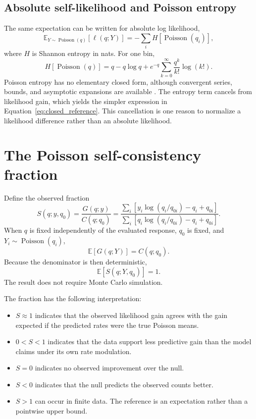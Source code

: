 \documentclass[11pt]{article}
\newcommand{\E}{\mathbb{E}}
\newcommand{\Pois}{\operatorname{Poisson}}
\begin{document}
\subsection{Absolute self-likelihood and Poisson entropy}

The same expectation can be written for absolute log likelihood,
\begin{equation}
\E_{Y\sim\Pois(q)}[\ell(q;Y)]
=
-\sum_i H[\Pois(q_i)],
\end{equation}
where $H$ is Shannon entropy in nats. For one bin,
\begin{equation}
H[\Pois(q)]
=
q-q\log q
+e^{-q}\sum_{k=0}^{\infty}\frac{q^k}{k!}\log(k!).
\end{equation}
Poisson entropy has no elementary closed form, although convergent series, bounds, and asymptotic expansions are available \cite{knessl1998,adell2010}. The entropy term cancels from likelihood gain, which yields the simpler expression in Equation~\ref{eq:closed_reference}. This cancellation is one reason to normalize a likelihood difference rather than an absolute likelihood.

\section{The Poisson self-consistency fraction}

Define the observed fraction
\begin{equation}
\boxed{
S(q;y,q_0)
=
\frac{G(q;y)}{C(q;q_0)}
=
\frac{
\sum_i\left[
 y_i\log(q_i/q_{0i})-q_i+q_{0i}
\right]
}{
\sum_i\left[
 q_i\log(q_i/q_{0i})-q_i+q_{0i}
\right]
}.
}
\label{eq:self_fraction}
\end{equation}
When $q$ is fixed independently of the evaluated response, $q_0$ is fixed, and $Y_i\sim\Pois(q_i)$,
\begin{equation}
\E[G(q;Y)]=C(q;q_0).
\end{equation}
Because the denominator is then deterministic,
\begin{equation}
\boxed{\E[S(q;Y,q_0)]=1.}
\end{equation}
The result does not require Monte Carlo simulation.

The fraction has the following interpretation:
\begin{itemize}
    \item $S\approx1$ indicates that the observed likelihood gain agrees with the gain expected if the predicted rates were the true Poisson means.
    \item $0<S<1$ indicates that the data support less predictive gain than the model claims under its own rate modulation.
    \item $S=0$ indicates no observed improvement over the null.
    \item $S<0$ indicates that the null predicts the observed counts better.
    \item $S>1$ can occur in finite data. The reference is an expectation rather than a pointwise upper bound.
\end{itemize}
\end{document}
